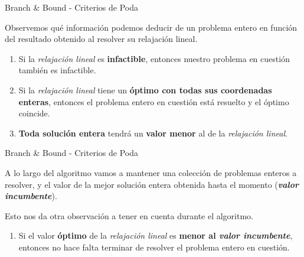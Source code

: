 \documentclass[10pt, aspectratio=169]{beamer}
\begin{document}
\begin{frame}{Branch \& Bound - Criterios de Poda}

	Observemos qu\'e informaci\'on podemos deducir de un problema entero en funci\'on del resultado obtenido al resolver su relajaci\'on lineal.
	\pause
	\begin{enumerate}
		\item Si la \textsl{relajaci\'on lineal} es \textbf{infactible}, entonces nuestro problema en cuesti\'on tambi\'en es infactible. 
		\pause
		\item Si la \textsl{relajaci\'on lineal} tiene un \textbf{\'optimo con todas sus coordenadas enteras}, entonces el problema entero en cuesti\'on est\'a resuelto y el \'optimo coincide.  
		\pause
		\item \textbf{Toda soluci\'on entera} tendr\'a un \textbf{valor menor} al de la  \textsl{relajaci\'on lineal}.  
	\end{enumerate}
	
\end{frame}

\begin{frame}{Branch \& Bound - Criterios de Poda}

	A lo largo del algoritmo vamos a mantener una colecci\'on de problemas enteros a resolver, y el valor de la mejor soluci\'on entera obtenida hasta el momento (\textsl{\textbf{valor incumbente}}). 
	\pause
	
	Esto nos da otra observaci\'on a tener en cuenta durante el algoritmo.
	\begin{enumerate}
		\item[4.] Si el valor \textbf{\'optimo} de la \textsl{relajaci\'on lineal} es \textbf{menor al \textsl{valor incumbente}}, entonces no hace falta terminar de resolver el problema entero en cuesti\'on.
	\end{enumerate}
\end{frame}
\end{document}
